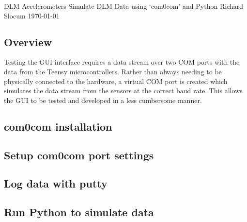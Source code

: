 \documentclass{article}
\begin{document}
	
	\insertSmallTitle
	{DLM Accelerometers}
	{Simulate DLM Data using `com0com' and Python}
	{Richard Slocum}
	{\today}
	
	\subsection*{Overview}
	
	Testing the GUI interface requires a data stream over two COM ports with the data from the Teensy microcontrollers.  Rather than always needing to be physically connected to the hardware, a virtual COM port is created which simulates the data stream from the sensors at the correct baud rate.  This allows the GUI to be tested and developed in a less cumbersome manner.  
	
	\subsection*{com0com installation}
	
	\subsection*{Setup com0com port settings}
	
	\subsection*{Log data with putty}
	
	\subsection*{Run Python to simulate data}
	
\end{document}
